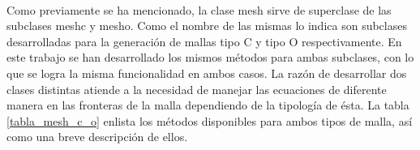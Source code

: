 \documentclass[letterpaper, openright, 12pt]{book}
\begin{document}
    \paragraph*{}
        Como previamente se ha mencionado, la clase mesh sirve de superclase de
        las subclases mesh\textunderscore c y mesh\textunderscore o. Como el
        nombre de las mismas lo indica son subclases desarrolladas para la
        generación de mallas tipo C y tipo O respectivamente. En este trabajo se
        han desarrollado los mismos métodos para ambas subclases, con lo que se
        logra la misma funcionalidad en ambos casos. La razón de desarrollar dos
        clases distintas atiende a la necesidad de manejar las ecuaciones de
        diferente manera en las fronteras de la malla dependiendo de la
        tipología de ésta. La tabla \ref{tabla_mesh_c_o} enlista los métodos
        disponibles para ambos tipos de malla, así como una breve descripción de
        ellos.
\end{document}
